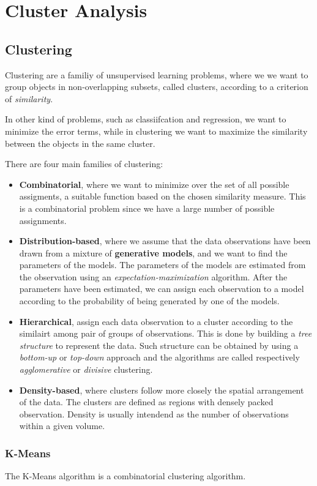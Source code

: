 \chapter{Cluster Analysis}
\section{Clustering}
Clustering are a familiy of unsupervised learning problems, where we we want to group objects in non-overlapping subsets, called clusters, according to a criterion of \textit{similarity}.

In other kind of problems, such as classiifcation and regression, we want to minimize the error terms, while in clustering we want to maximize the similarity between the objects in the same cluster.

There are four main families of clustering:
\begin{itemize}
    \item \textbf{Combinatorial}, where we want to minimize over the set of all possible assigments, a suitable function based on the chosen similarity measure. This is a combinatorial problem since we have a large number of possible assignments.
    \item \textbf{Distribution-based}, where we assume that the data observations have been drawn from a mixture of \textbf{generative models}, and we want to find the parameters of the models. The parameters of the models are estimated from the observation using an \textit{expectation-maximization} algorithm. After the parameters have been estimated, we can assign each observation to a model according to the probability of being generated by one of the models.
    \item \textbf{Hierarchical}, assign each data observation to a cluster according to the similairt among pair of groups of observations. This is done by building a \textit{tree structure} to represent the data. Such structure can be obtained by using a \textit{bottom-up} or \textit{top-down} approach and the algorithms are called respectively \textit{agglomerative} or \textit{divisive} clustering.
    \item \textbf{Density-based}, where clusters follow more closely the spatial arrangement of the data. The clusters are defined as regions with densely packed observation. Density is usually intendend as the number of observations within a given volume.
\end{itemize}

\subsection*{K-Means}
The K-Means algorithm is a combinatorial clustering algorithm.

